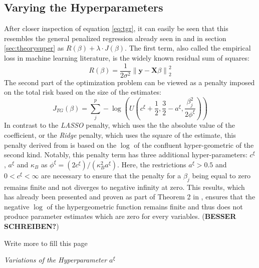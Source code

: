 \documentclass[12pt,a4paper]{article}
\newenvironment{lightbluebox}{%
    \begin{tcolorbox}[colback=lightblue, colframe=lightblue, fontupper=\itshape]%
}{%
    \end{tcolorbox}%
}
\newcommand{\norm}[1]{\left\lVert#1\right\rVert}
\begin{document}
\subsection{Varying the Hyperparameters}
After closer inspection of equation \ref{eq:tgr}, it can easily be seen that this resembles the general penalized regression already seen in \textcite{ESLpage398} and in section \ref{sec:theorysuper} as $R(\beta) + \lambda\cdot J(\beta)$. The first term, also called the empirical loss in machine learning literature, is the widely known residual sum of squares:
\[
R(\beta)=\frac{1}{2\sigma^2}\norm{\mathbf{y} - \mathbf{X}\beta}_2^2
\] 
The second part of the optimization problem can be viewed as a penalty imposed on the total risk based on the size of the estimates:
\[
J_{TG}(\beta) = \sum_j^p -\log\left(U\left(c^\xi + \frac{1}{2}, \frac{3}{2}-a^\xi, \frac{\beta_j^2}{2\phi^\xi}\right)\right)
\]
In contrast to the \textit{LASSO} penalty, which uses the the absolute value of the coefficient, or the \textit{Ridge} penalty, which uses the square of the estimate, this penalty derived from \textcite{TGP2020} is based on the $\log$ of the confluent hyper-geometric of the second kind. Notably, this penalty term has three additional hyper-parameters: $c^\xi$, $a^\xi$ and $\kappa_B$ as $\phi^\xi = (2c^\xi)/(\kappa^2_B a^\xi)$. Here, the restrictions $a^\xi>0.5$ and $0 < c^\xi < \infty$ are necessary to ensure that the penalty for a $\beta_j$ being equal to zero remains finite and not diverges to negative infinity at zero. This results, which has already been presented and proven as part of Theorem 2 in \textcite[5--6]{TGP2020}, ensures that the negative $\log$ of the hypergeometric function remains finite and thus does not produce parameter estimates which are zero for every variables. (\textbf{BESSER SCHREIBEN?})\\
\begin{lightbluebox}
Write more to fill this page
\end{lightbluebox}
\newpage

\textit{Variations of the Hyperparameter $a^\xi$}\\
\end{document}
